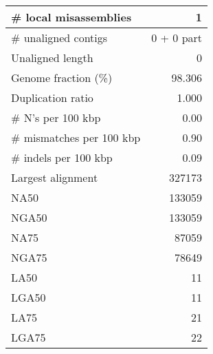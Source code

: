 \documentclass[12pt,a4paper]{article}
\begin{document}
\begin{table}[ht]
\begin{center}
\begin{tabular}{|l*{1}{|r}|}
\# local misassemblies & 1 \\ \hline
\# unaligned contigs & 0 + 0 part \\ \hline
Unaligned length & 0 \\ \hline
Genome fraction (\%) & 98.306 \\ \hline
Duplication ratio & 1.000 \\ \hline
\# N's per 100 kbp & 0.00 \\ \hline
\# mismatches per 100 kbp & 0.90 \\ \hline
\# indels per 100 kbp & 0.09 \\ \hline
Largest alignment & 327173 \\ \hline
NA50 & 133059 \\ \hline
NGA50 & 133059 \\ \hline
NA75 & 87059 \\ \hline
NGA75 & 78649 \\ \hline
LA50 & 11 \\ \hline
LGA50 & 11 \\ \hline
LA75 & 21 \\ \hline
LGA75 & 22 \\ \hline
\end{tabular}
\end{center}
\end{table}
\end{document}
